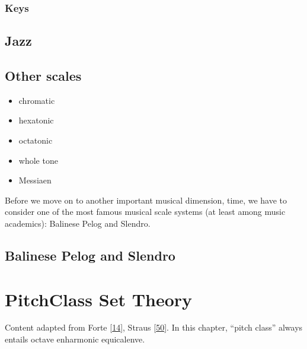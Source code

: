 \documentclass[letterpaper,10pt,english]{sphinxmanual}
\begin{document}
\subsection{Keys}
\label{\detokenize{2_scales_modes:keys}}

\section{Jazz}
\label{\detokenize{2_scales_modes:jazz}}

\section{Other scales}
\label{\detokenize{2_scales_modes:other-scales}}\begin{itemize}
\item {} 
\sphinxAtStartPar
chromatic

\item {} 
\sphinxAtStartPar
hexatonic

\item {} 
\sphinxAtStartPar
octatonic

\item {} 
\sphinxAtStartPar
whole tone

\item {} 
\sphinxAtStartPar
Messiaen

\end{itemize}

\sphinxAtStartPar
Before we move on to another important musical dimension, time, we have to consider
one of the most famous musical scale systems (at least among music academics): Balinese Pelog and Slendro.


\section{Balinese Pelog and Slendro}
\label{\detokenize{2_scales_modes:balinese-pelog-and-slendro}}

\chapter{Pitch\sphinxhyphen{}Class Set Theory}
\label{\detokenize{3_set_theory:pitch-class-set-theory}}\label{\detokenize{3_set_theory::doc}}
\sphinxAtStartPar
Content adapted from Forte {[}\hyperlink{cite.8_bibliography:id19}{14}{]}, Straus {[}\hyperlink{cite.8_bibliography:id3}{50}{]}.
In this chapter, “pitch class” always entails octave  enharmonic equicalenve.
\end{document}
